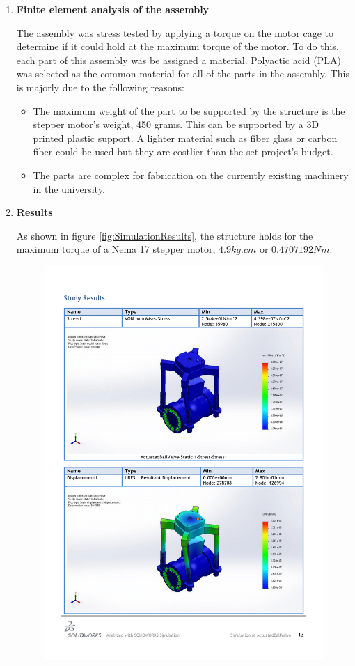 \begin{enumerate}
\begin{enumerate}
    \item \textbf{Finite element analysis of the assembly}
    \par
    The assembly was stress tested by applying a torque on the motor cage to determine if it could hold at the maximum torque of the motor. To do this, each part of this assembly was be assigned a material. Polyactic acid (PLA) was selected as the common material for all of the parts in the assembly. This is majorly due to the following reasons:
    \begin{itemize}
        \item The maximum weight of the part to be supported by the structure is the stepper motor's weight, 450 grams. This can be supported by a 3D printed plastic support. A lighter material such as fiber glass or carbon fiber could be used but they are costlier than the set project's budget.
        \item The parts are complex for fabrication on the currently existing machinery in the university.
    \end{itemize}
    \par
    \item \textbf{Results}
    \par
    As shown in figure \ref{fig:SimulationResults}, the structure holds for the maximum torque of a Nema 17 stepper motor, $4.9 kg.cm$ or $0.4707192 Nm$.
    \begin{figure}[H]
        \centering
        \includegraphics[width=\textwidth]{Figures/ActuatedBallValve-Static-1-1-1.png}

\end{figure}
\end{enumerate}
\end{enumerate}
